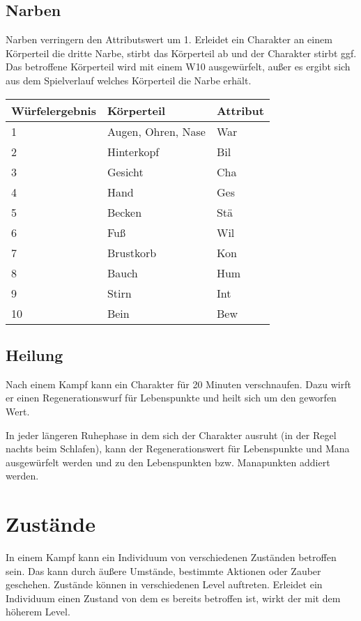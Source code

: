 \documentclass[../../Heldenanleitung2]{subfiles}
\begin{document}
\subsection{Narben}
Narben verringern den Attributswert um 1. Erleidet ein Charakter an einem Körperteil die dritte Narbe, stirbt das Körperteil ab und der Charakter stirbt ggf. Das betroffene Körperteil wird mit einem W10 ausgewürfelt, außer es ergibt sich aus dem Spielverlauf welches Körperteil die Narbe erhält.

{
\begin{center}
\begin{tabular}{|l|l|l|}
\hline
Würfelergebnis & Körperteil & Attribut \\ \hline
1 & Augen, Ohren, Nase & War \\ 
2 & Hinterkopf & Bil \\ 
3 & Gesicht & Cha \\ 
4 & Hand & Ges \\ 
5 & Becken & Stä \\ 
6 & Fuß & Wil \\ 
7 & Brustkorb & Kon \\ 
8 & Bauch & Hum \\ 
9 & Stirn & Int \\ 
10 & Bein & Bew \\ \hline
\end{tabular}
\end{center}
}

\subsection{Heilung}
Nach einem Kampf kann ein Charakter für 20 Minuten verschnaufen. Dazu wirft er einen Regenerationswurf für Lebenspunkte und heilt sich um den geworfen Wert.

In jeder längeren Ruhephase in dem sich der Charakter ausruht (in der Regel nachts beim Schlafen), kann der Regenerationswert für Lebenspunkte und Mana ausgewürfelt werden und zu den Lebenspunkten bzw. Manapunkten addiert werden.

\section{Zustände}

In einem Kampf kann ein Individuum von verschiedenen Zuständen betroffen sein. Das kann durch äußere Umstände, bestimmte Aktionen oder Zauber geschehen. Zustände können in verschiedenen Level auftreten. Erleidet ein Individuum einen Zustand von dem es bereits betroffen ist, wirkt der mit dem höherem Level.
\end{document}
